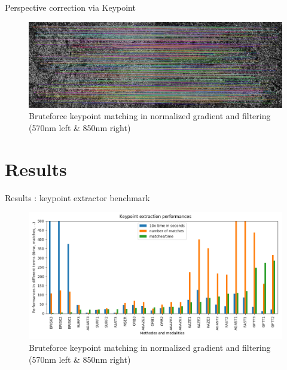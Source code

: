 \documentclass{beamer}
\begin{document}
		\begin{frame}{Perspective correction via Keypoint}
			\begin{figure}
				\includegraphics[width=\linewidth]{../figures/prespective-feature-matching}
				\caption{Bruteforce keypoint matching in normalized gradient and filtering (570nm left \& 850nm right)}
			\end{figure}
		\end{frame}
	
	\section{Results}
	
		\begin{frame}{Results : keypoint extractor benchmark}
			\begin{figure}
				\includegraphics[width=0.8\linewidth]{../figures/comparaison-keypoint-performances}
				\caption{Bruteforce keypoint matching in normalized gradient and filtering (570nm left \& 850nm right)}
			\end{figure}
		\end{frame}
	
\end{document}
